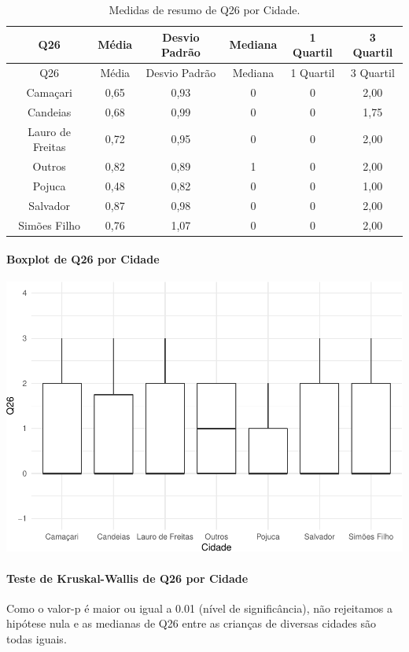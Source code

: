\documentclass[]{article}
\let\oldparagraph\paragraph
\renewcommand{\paragraph}[1]{\oldparagraph{#1}\mbox{}}
\begin{document}
\begin{longtable}[]{@{}cccccc@{}}
\caption{\label{tab:unnamed-chunk-725}Medidas de resumo de Q26 por Cidade.}\tabularnewline
\toprule
Q26 & Média & Desvio Padrão & Mediana & 1 Quartil & 3 Quartil\tabularnewline
\midrule
\endfirsthead
\toprule
Q26 & Média & Desvio Padrão & Mediana & 1 Quartil & 3 Quartil\tabularnewline
\midrule
\endhead
Camaçari & 0,65 & 0,93 & 0 & 0 & 2,00\tabularnewline
Candeias & 0,68 & 0,99 & 0 & 0 & 1,75\tabularnewline
Lauro de Freitas & 0,72 & 0,95 & 0 & 0 & 2,00\tabularnewline
Outros & 0,82 & 0,89 & 1 & 0 & 2,00\tabularnewline
Pojuca & 0,48 & 0,82 & 0 & 0 & 1,00\tabularnewline
Salvador & 0,87 & 0,98 & 0 & 0 & 2,00\tabularnewline
Simões Filho & 0,76 & 1,07 & 0 & 0 & 2,00\tabularnewline
\bottomrule
\end{longtable}

\hypertarget{boxplot-de-q26-por-cidade}{%
\paragraph{Boxplot de Q26 por Cidade}\label{boxplot-de-q26-por-cidade}}

\begin{center}\includegraphics[width=0.75\linewidth]{relatorio_covid19_files/figure-latex/unnamed-chunk-726-1} \end{center}

\hypertarget{teste-de-kruskal-wallis-de-q26-por-cidade}{%
\paragraph{Teste de Kruskal-Wallis de Q26 por Cidade}\label{teste-de-kruskal-wallis-de-q26-por-cidade}}

Como o valor-p é maior ou igual a 0.01 (nível de significância), não rejeitamos a hipótese nula e as medianas de Q26 entre as crianças de diversas cidades são todas iguais.
\end{document}

